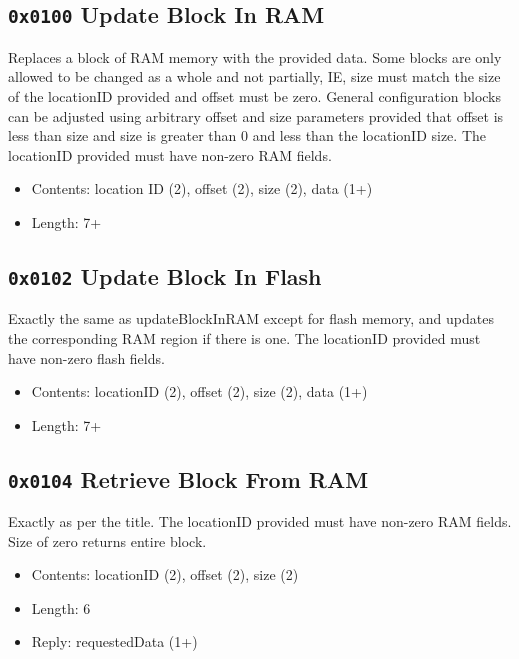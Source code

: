 \documentclass[12pt,a4paper,titlepage]{article}
\begin{document}
\begin{titlepage}
\begin{center}
\subsection{\texttt{0x0100} Update Block In RAM}

Replaces a block of RAM memory with the provided data. Some blocks are only allowed to be changed as a whole and not partially, IE, size must match the size of the locationID provided and offset must be zero. General configuration blocks can be adjusted using arbitrary offset and size parameters provided that offset is less than size and size is greater than 0 and less than the locationID size. The locationID provided must have non-zero RAM fields.

\begin{itemize}
\item Contents: location ID (2),  offset (2), size (2), data (1+)
\item Length: 7+
\end{itemize}


\subsection{\texttt{0x0102} Update Block In Flash}

Exactly the same as updateBlockInRAM except for flash memory, and updates the corresponding RAM region if there is one. The locationID provided must have non-zero flash fields.

\begin{itemize}
\item Contents: locationID (2),  offset (2), size (2), data (1+)
\item Length: 7+
\end{itemize}


\subsection{\texttt{0x0104} Retrieve Block From RAM}

Exactly as per the title. The locationID provided must have non-zero RAM fields. Size of zero returns entire block.

\begin{itemize}
\item Contents: locationID (2),  offset (2), size (2)
\item Length: 6
\item Reply: requestedData (1+)
\end{itemize}



\end{center}
\end{titlepage}
\end{document}
